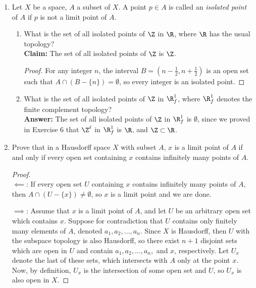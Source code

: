 \documentclass[letterpaper]{article}
\begin{document}
\begin{enumerate}
\textbf{Claim:} $\Z^\ell$ in $\R_f^1$ is $\R$. 
\begin{proof}
In the finite complement topology on $\R$, every open set has a finite complement; that is, there is a greatest element of $\R$ which the set does not contain. This means every open set is unbounded above. Since $\Z$ is also unbounded above, every set which is open in $\R$ contains elements of $\Z$. Thus, for any real number $x$, every open set containing $x$ also contains elements of $\Z$ distinct from $x$, so $x$ is a limit point.
\end{proof}
\pagebreak
\item Let $X$ be a space, $A$ a subset of $X$. A point $p \in A$ is called an \emph{isolated point} of $A$ if $p$ is not a limit point of $A$.
	\begin{enumerate}[label=(\alph*)]
	\item What is the set of all isolated points of $\Z$ in $\R$, where $\R$ has the usual topology?\\
	\textbf{Claim: }The set of all isolated points of $\Z$ is $\Z$.
	\begin{proof}
	For any integer $n$, the interval $B=(n-\frac{1}{2},n+\frac{1}{2})$ is an open set such that $A\cap(B-\{n\})=\emptyset$, so every integer is an isolated point. 
	\end{proof}
	\item What is the set of all isolated points of $\Z$ in $\R_f^1$, where $\R_f^1$ denotes the finite complement topology?\\
	\textbf{Answer:} The set of all isolated points of $\Z$ in $\R_f^1$ is $\emptyset$, since we proved in Exercise 6 that $\Z^\ell$ in $\R_f^1$ is $\R$, and $\Z \subset	\R$. 
	\end{enumerate}

\item Prove that in a Hausdorff space $X$ with subset $A$, $x$ is a limit point of $A$ if and only if every open set containing $x$ contains infinitely many points of $A$.

\begin{proof}\mbox{}\\
$\impliedby$: If every open set $U$ containing $x$ contains infinitely many points of $A$, then $A\cap(U-\{x\})\neq \emptyset$, so $x$ is a limit point and we are done. 

$\implies$: Assume that $x$ is a limit point of $A$, and let $U$ be an arbitrary open set which contains $x$. Suppose for contradiction that $U$ contains only finitely many elements of $A$, denoted $a_1, a_2, \ldots, a_n$. Since $X$ is Hausdorff, then $U$ with the subspace topology is also Hausdorff, so
there exist $n+1$ disjoint sets which are open in $U$ and contain $a_1, a_2, \ldots, a_n,$ and $x$, respectively. Let $U_x$ denote the last of these sets, which intersects with $A$ only at the point $x$. Now, by definition, $U_x$ is the intersection of some open set and $U$, so $U_x$ is also open in $X$. 


\end{proof}
\end{enumerate}
\end{document}
